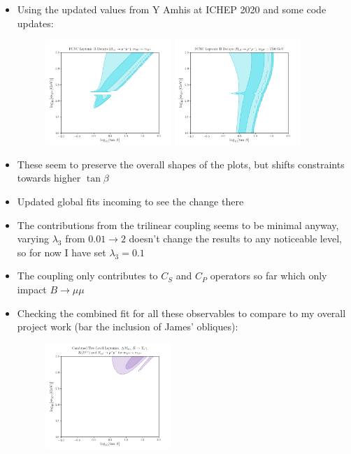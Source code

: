 \documentclass[11pt]{article}
\begin{document}
\begin{itemize}
    \item Using the updated values from Y Amhis at ICHEP 2020 and some code updates:
        \begin{figure}[H]
            \centering
            \includegraphics[width=0.45\textwidth]{bmumu_apx_new.png}
            \includegraphics[width=0.45\textwidth]{bmumu_fix_new.png}
        \end{figure}
    \item These seem to preserve the overall shapes of the plots, but shifts constraints towards higher $\tan\beta$
    \item Updated global fits incoming to see the change there
    \item The contributions from the trilinear coupling seems to be minimal anyway, varying $\lambda_3$ from $0.01\to2$ doesn't change the results to any noticeable level, so for now I have set $\lambda_3=0.1$
    \item The coupling only contributes to $C_S$ and $C_P$ operators so far which only impact $B\to\mu\mu$
    \item Checking the combined fit for all these observables to compare to my overall project work (bar the inclusion of James' obliques):
        \begin{figure}[H]
            \centering
            \includegraphics[width=0.45\textwidth]{comb2_apx_new.png}

\end{figure}
\end{itemize}
\end{document}
